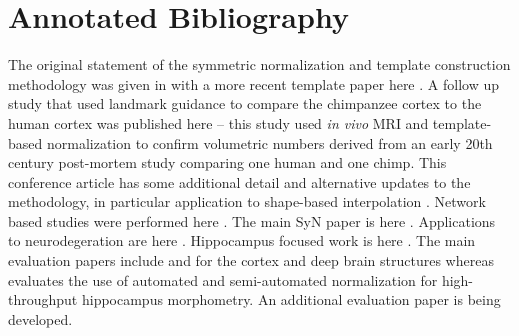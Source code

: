 \documentclass{InsightArticle}
\begin{document}
\section{Annotated Bibliography}
The original statement of the symmetric normalization and template
construction methodology was given in \cite{Avants2004} with a more 
recent template paper here \cite{Avants2009c}. 
A follow up study that used landmark guidance to compare the chimpanzee cortex to
the human cortex was published here \cite{Avants2006} -- this study
used {\em in vivo} MRI and template-based normalization to confirm
volumetric numbers derived from an early 20th century post-mortem
study comparing one human and one chimp.  This conference article has
some additional detail and alternative updates to the methodology, in
particular application to shape-based interpolation
\cite{Avants2005b}.  Network based studies were performed here
\cite{duda08miccai,duda08cvpr}.  The main SyN paper is here
\cite{Avants2008}.  Applications to neurodegeration are here
\cite{Avants2005,Avants2008a,Grossman2008,Avants2009,Das2009,Yushkevich2009,Massimo2009}.
Hippocampus focused work is here \cite{Pluta2009,Yushkevich2009}.  The
main evaluation papers include \cite{Avants2008} and \cite{Klein2009}
for the cortex and deep brain structures whereas \cite{Pluta2009}
evaluates the use of automated and semi-automated normalization for
high-throughput hippocampus morphometry.  An additional evaluation
paper is being developed.  


%
%



\end{document}
